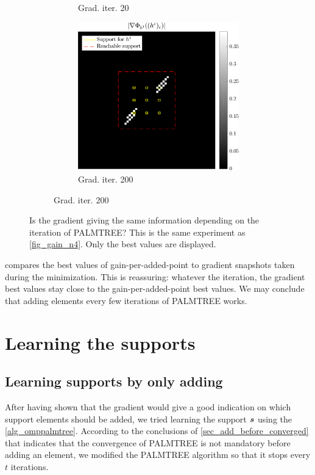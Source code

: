 \begin{figure}[!ht]
\begin{subfigure}[b]{0.49\linewidth}
\begin{subfigure}[b]{0.49\linewidth}
	\caption{Grad. iter. 20}
	\end{subfigure}
	\begin{subfigure}[b]{0.49\linewidth}\centering
	\includegraphics[width=\linewidth]{figures/xp_grad_iterations/xp_128x128_sc2_angl1_K3_S3_node4_iter200_partgrad4_bestvalues.pdf}
	\caption{Grad. iter. 200}
	\end{subfigure}
\end{subfigure}
\caption{Is the gradient giving the same information depending on the iteration of \ac{PALMTREE}? This is the same experiment as \cref{fig_gain_n4}. Only the best values are displayed.}\label{fig_iter_gain_vs_grad}
\end{figure}

 compares the best values of gain-per-added-point to gradient snapshots taken during the minimization. This is reassuring: whatever the iteration, the gradient best values stay close to the gain-per-added-point best values. We may conclude that adding elements every few iterations of \ac{PALMTREE} works.


\section{Learning the supports}

\subsection{Learning supports by only adding}
After having shown that the gradient would give a good indication on which support elements should be added, we tried learning the support $\bm{s}$ using the \cref{alg_omppalmtree}. According to the conclusions of \cref{sec_add_before_converged} that indicates that the convergence of \ac{PALMTREE} is not mandatory before adding an element, we modified the \ac{PALMTREE} algorithm so that it stops every $t$ iterations.

